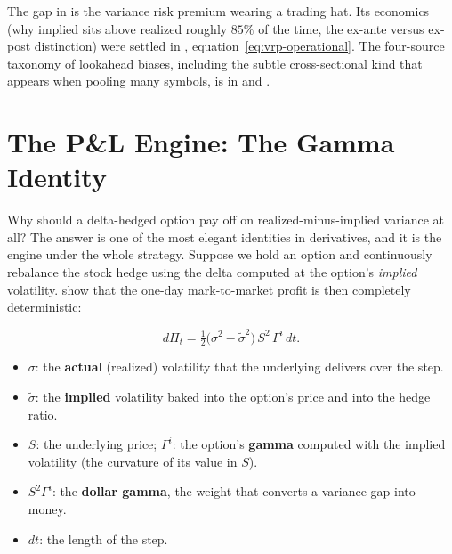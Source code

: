 \begin{warning}
The gap in  is the variance risk premium wearing a trading hat. Its economics (why implied sits above realized roughly $85\%$ of the time, the ex-ante versus ex-post distinction) were settled in , equation~\eqref{eq:vrp-operational}. The four-source taxonomy of lookahead biases, including the subtle cross-sectional kind that appears when pooling many symbols, is in  and .
\end{warning}

\section{The P\&L Engine: The Gamma Identity}
\label{sec:ivrv:pnl-engine}

Why should a delta-hedged option pay off on realized-minus-implied variance at all? The answer is one of the most elegant identities in derivatives, and it is the engine under the whole strategy. Suppose we hold an option and continuously rebalance the stock hedge using the delta computed at the option's \emph{implied} volatility. \citet{AhmadWilmott2005} show that the one-day mark-to-market profit is then completely deterministic:

\begin{equation}
\label{eq:ivrv:aw-daily}
d\Pi_t = \tfrac{1}{2}\big(\sigma^2 - \tilde{\sigma}^2\big)\,S^2\,\Gamma^{i}\,dt .
\end{equation}

\begin{itemize}
  \item $\sigma$: the \textbf{actual} (realized) volatility that the underlying delivers over the step.
  \item $\tilde{\sigma}$: the \textbf{implied} volatility baked into the option's price and into the hedge ratio.
  \item $S$: the underlying price; $\Gamma^{i}$: the option's \textbf{gamma} computed with the implied volatility (the curvature of its value in $S$).
  \item $S^2\Gamma^{i}$: the \textbf{dollar gamma}, the weight that converts a variance gap into money.
  \item $dt$: the length of the step.
\end{itemize}

